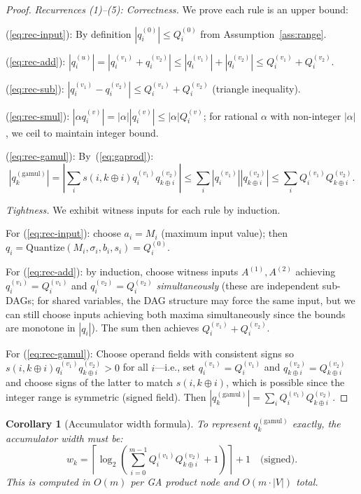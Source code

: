 \documentclass[11pt,a4paper]{article}
\theoremstyle{definition}
\theoremstyle{plain}
\newtheorem{corollary}{Corollary}[section]
\theoremstyle{remark}
\newcommand{\Quantize}{\mathrm{Quantize}}
\begin{document}
\begin{proof}
\textit{Recurrences (1)--(5): Correctness.}  We prove each rule is an upper bound:

(\ref{eq:rec-input}): By definition $|q_i^{(0)}| \le Q_i^{(0)}$ from Assumption~\ref{ass:range}.

(\ref{eq:rec-add}): $|q_i^{(u)}| = |q_i^{(v_1)} + q_i^{(v_2)}| \le |q_i^{(v_1)}| + |q_i^{(v_2)}| \le Q_i^{(v_1)} + Q_i^{(v_2)}$.

(\ref{eq:rec-sub}): $|q_i^{(v_1)} - q_i^{(v_2)}| \le Q_i^{(v_1)} + Q_i^{(v_2)}$ (triangle inequality).

(\ref{eq:rec-smul}): $|\alpha q_i^{(v)}| = |\alpha| |q_i^{(v)}| \le |\alpha| Q_i^{(v)}$; for rational $\alpha$ with non-integer $|\alpha|$, we ceil to maintain integer bound.

(\ref{eq:rec-gamul}): By~(\ref{eq:gaprod}):
\[
|q_k^{(\mathrm{gamul})}| = \left|\sum_{i} s(i,k\oplus i) q_i^{(v_1)} q_{k\oplus i}^{(v_2)}\right| \le \sum_i |q_i^{(v_1)}| |q_{k\oplus i}^{(v_2)}| \le \sum_i Q_i^{(v_1)} Q_{k\oplus i}^{(v_2)}.
\]

\textit{Tightness.}  We exhibit witness inputs for each rule by induction.

For (\ref{eq:rec-input}): choose $a_i = M_i$ (maximum input value); then $q_i = \Quantize(M_i,\sigma_i,b_i,s_i) = Q_i^{(0)}$.

For (\ref{eq:rec-add}): by induction, choose witness inputs $A^{(1)}, A^{(2)}$ achieving $q_i^{(v_1)} = Q_i^{(v_1)}$ and $q_i^{(v_2)} = Q_i^{(v_2)}$ \emph{simultaneously} (these are independent sub-DAGs; for shared variables, the DAG structure may force the same input, but we can still choose inputs achieving both maxima simultaneously since the bounds are monotone in $|q_i|$). The sum then achieves $Q_i^{(v_1)} + Q_i^{(v_2)}$.

For (\ref{eq:rec-gamul}): Choose operand fields with consistent signs so $s(i,k\oplus i) q_i^{(v_1)} q_{k\oplus i}^{(v_2)} > 0$ for all $i$---i.e., set $q_i^{(v_1)} = Q_i^{(v_1)}$ and $q_{k\oplus i}^{(v_2)} = Q_{k\oplus i}^{(v_2)}$ and choose signs of the latter to match $s(i,k\oplus i)$, which is possible since the integer range is symmetric (signed field).  Then $|q_k^{(\mathrm{gamul})}| = \sum_i Q_i^{(v_1)} Q_{k\oplus i}^{(v_2)}$.
\end{proof}

\begin{corollary}[Accumulator width formula]
\label{cor:accum}
To represent $q_k^{(\mathrm{gamul})}$ exactly, the accumulator width must be:
\begin{equation}\label{eq:accum-width}
  w_k = \left\lceil \log_2\!\left(\sum_{i=0}^{m-1} Q_i^{(v_1)} Q_{k\oplus i}^{(v_2)} + 1\right)\right\rceil + 1 \quad\text{(signed).}
\end{equation}
This is computed in $O(m)$ per GA product node and $O(m\cdot|V|)$ total.
\end{corollary}
\end{document}
